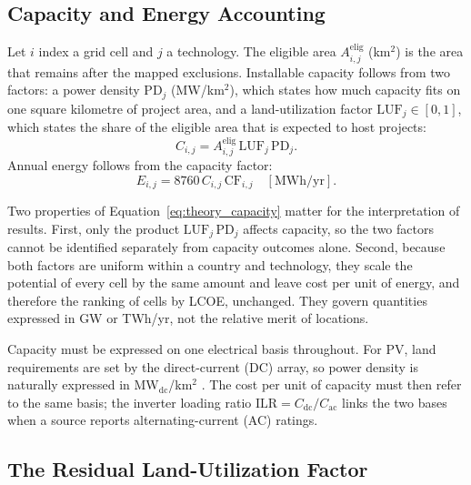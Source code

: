 \subsection{Capacity and Energy Accounting}
\label{subsec:capacity_accounting}

Let $i$ index a grid cell and $j$ a technology. The eligible area
$A^{\mathrm{elig}}_{i,j}$ (km$^2$) is the area that remains after the
mapped exclusions. Installable capacity follows from two factors: a
power density $\mathrm{PD}_j$ (MW/km$^2$), which states how much
capacity fits on one square kilometre of project area, and a
land-utilization factor $\mathrm{LUF}_j\in[0,1]$, which states the share
of the eligible area that is expected to host projects:
\begin{equation}
    C_{i,j} = A^{\mathrm{elig}}_{i,j}\,\mathrm{LUF}_j\,\mathrm{PD}_j .
    \label{eq:theory_capacity}
\end{equation}
Annual energy follows from the capacity factor:
\begin{equation}
    E_{i,j} = 8760\,C_{i,j}\,\mathrm{CF}_{i,j}
    \quad [\mathrm{MWh/yr}] .
    \label{eq:theory_energy}
\end{equation}

Two properties of Equation~\ref{eq:theory_capacity} matter for the
interpretation of results. First, only the product
$\mathrm{LUF}_j\,\mathrm{PD}_j$ affects capacity, so the two factors
cannot be identified separately from capacity outcomes alone. Second,
because both factors are uniform within a country and technology, they
scale the potential of every cell by the same amount and leave cost per
unit of energy, and therefore the ranking of cells by LCOE, unchanged.
They govern quantities expressed in GW or TWh/yr, not the relative
merit of locations.

Capacity must be expressed on one electrical basis throughout. For PV,
land requirements are set by the direct-current (DC) array, so power
density is naturally expressed in MW$_{\mathrm{dc}}$/km$^2$
\cite{bolinger2022}. The cost per unit of capacity must then refer to the
same basis; the inverter loading ratio
$\mathrm{ILR}=C_{\mathrm{dc}}/C_{\mathrm{ac}}$ links the two bases when a
source reports alternating-current (AC) ratings.

\subsection{The Residual Land-Utilization Factor}
\label{subsec:luf_theory}

